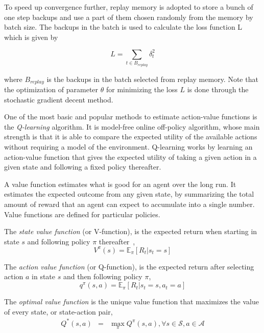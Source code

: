 To speed up convergence further, replay memory is adopted to store a bunch of one step backups and use a part of them chosen randomly from the memory by batch size. The backups in the batch is used to calculate the loss function L which is given by

\begin{equation}
L = \sum_{t\in B_{replay}}\delta_t^2
\end{equation}

where $B_{replay}$ is the backups in the batch selected from replay memory. Note that the optimization of parameter $\theta$ for minimizing the loss $L$ is done through the stochastic gradient decent method.



One of the most basic and popular methods to estimate action-value functions is the \emph{Q-learning} algorithm. It is model-free online off-policy algorithm, whose main strength is that it is able to compare the expected utility of the available actions without requiring a model of the environment. Q-learning works by learning an action-value function that gives the expected utility of taking a given action in a given state and following a fixed policy thereafter.

A value function estimates what is good for an agent over the long run. It estimates the expected outcome from any given state, by summarizing the total amount of reward that an agent can expect to accumulate into a single number. Value functions are defined for particular policies.

The \emph{state value function} (or V-function), is the expected return when starting in state $s$ and following policy $\pi$ thereafter~\citep{Sutton1998RL},
%
\begin{equation}
V^\pi(s) = \mathbb{E}_\pi \left[R_t | s_t = s \right]
\end{equation}

The \emph{action value function} (or Q-function), is the expected return after selecting action $a$ in state $s$ and then following policy $\pi$,
%
\begin{equation}
q^\pi(s,a) = \mathbb{E}_\pi \left[ R_t | s_t = s, a_t = a \right]
\end{equation}

The \emph{optimal value function} is the unique value function that maximizes the value of every state, or state-action pair,
%
\begin{eqnarray}
Q^*(s,a) & = & \max\limits_\pi Q^\pi(s,a), \forall s \in \mathcal{S}, a \in \mathcal{A}
\end{eqnarray}

